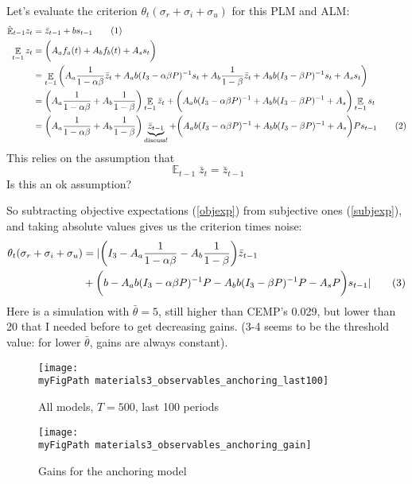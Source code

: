 \documentclass[11pt]{article}
\def \myFigPath {../figures/}
\renewcommand{\[}{\begin{equation}}
\renewcommand{\]}{\end{equation}}
\DeclareMathOperator{\E}{\mathbb{E}}
\def\myFigScale{0.3}
\newcommand\numberthis{\addtocounter{equation}{1}\tag{\theequation}} %
\begin{document}
Let's evaluate the criterion $\theta_t (\sigma_r + \sigma_i + \sigma_u)$ for this PLM and ALM:
 \begin{align*}
 \hat{\E}_{t-1}z_t & =\bar{z}_{t-1} + b s_{t-1} \numberthis \label{subjexp} \\
  \E_{t-1}z_t & = \bigg( A_a f_a(t) + A_b f_b(t) + A_s s_t\bigg) \\
  & = \E_{t-1}\bigg( A_a \frac{1}{1-\alpha\beta}\bar{z}_{t}  + A_a b(I_3 - \alpha\beta P)^{-1}s_t 
   +A_b \frac{1}{1-\beta}\bar{z}_{t}  + A_b b(I_3 - \beta P)^{-1}s_t  + A_s s_t\bigg) \\
   & = \bigg(A_a  \frac{1}{1-\alpha\beta}+ A_b \frac{1}{1-\beta}  \bigg) \E_{t-1}\bar{z}_{t}  
   + \bigg( A_a b(I_3 - \alpha\beta P)^{-1}+ A_bb(I_3 - \beta P)^{-1}  +A_s\bigg) \E_{t-1}s_t \\
   & = \bigg(A_a  \frac{1}{1-\alpha\beta}+ A_b \frac{1}{1-\beta}  \bigg)\underbrace{\bar{z}_{t-1}}_{\text{discuss!}}  
   + \bigg( A_a b(I_3 - \alpha\beta P)^{-1}+ A_bb(I_3 - \beta P)^{-1}  +A_s\bigg) Ps_{t-1} \numberthis \label{objexp}
 \end{align*}
This relies on the assumption that
\begin{equation}
 \E_{t-1}\bar{z}_{t}   = \bar{z}_{t-1}  \label{ass}
\end{equation}
Is this an ok assumption?

So subtracting objective expectations (\ref{objexp}) from subjective ones (\ref{subjexp}), and taking absolute values gives us the criterion times noise:
\begin{align*}
\theta_t (\sigma_r + \sigma_i + \sigma_u) & = |\bigg(I_3 - A_a  \frac{1}{1-\alpha\beta}- A_b \frac{1}{1-\beta}  \bigg)\bar{z}_{t-1}  \\
  & + \bigg(b - A_a b(I_3 - \alpha\beta P)^{-1}P- A_bb(I_3 - \beta P)^{-1}P  -A_sP\bigg) s_{t-1} |\numberthis \label{criterion_final}
\end{align*}
Here is a simulation with $\bar{\theta} = 5$, still higher than CEMP's 0.029, but lower than 20 that I needed before to get decreasing gains. (3-4 seems to be the threshold value: for lower $\bar{\theta}$, gains are always constant). 

\begin{figure}[h!]
\texttt{[image: \\myFigPath materials3\_observables\_anchoring\_last100]} 
\caption{All models, $T = 500$, last 100 periods}
\end{figure}
\newpage
\begin{figure}[h!]
\texttt{[image: \\myFigPath materials3\_observables\_anchoring\_gain]} 
\caption{Gains for the anchoring model}
\end{figure}
\end{document}
